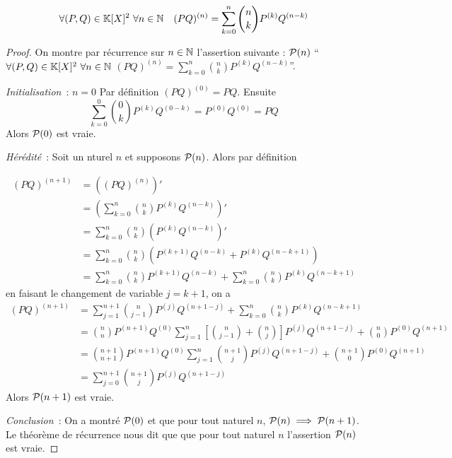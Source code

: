 \begin{theo}
  \begin{equation}
    \forall (P,Q) \in \K[X]^2 \ \forall n \in \N \quad (PQ)^{(n)} = \sum_{k = 0}^n 
    \binom{n}{k} P^{(k)}Q^{(n-k)}
  \end{equation}
\end{theo}
\begin{proof}
  On montre par récurrence sur \(n \in \N\) l'assertion suivante : \(\P(n)\) 
  ``\(\forall (P,Q) \in \K[X]^2 \ \forall n \in \N\) \((PQ)^{(n)} = \sum_{k = 0}^n 
  \binom{n}{k} P^{(k)}Q^{(n-k)}\)''.

  \emph{Initialisation}~: \(n = 0\) Par définition \((PQ)^{(0)} = PQ\). Ensuite
  \begin{equation}
    \sum_{k = 0}^0 \binom{0}{k} P^{(k)}Q^{(0-k)} = P^{(0)} Q^{(0)} = PQ
  \end{equation}
  Alors \(\P(0)\) est  vraie.

  \emph{Hérédité}~: Soit un nturel \(n\) et supposons \(\P(n)\). Alors par 
  définition

  \begin{align}
    (PQ)^{(n+1)} &= \left((PQ)^{(n)}\right)' \\
    & = \left(\sum_{k = 0}^n \binom{n}{k} P^{(k)}Q^{(n-k)}\right)'\\
    & = \sum_{k = 0}^n \binom{n}{k} (P^{(k)}Q^{(n-k)})'\\
    & = \sum_{k = 0}^n \binom{n}{k} (P^{(k+1)}Q^{(n-k)} + P^{(k)} Q^{(n-k+1)})\\
    & = \sum_{k = 0}^n \binom{n}{k} P^{(k+1)}Q^{(n-k)} + \sum_{k = 0}^n \binom{n}{k} 
    P^{(k)} Q^{(n-k+1)}
  \end{align}
  en faisant le changement de variable \(j = k+1\), on a
  \begin{align}
    (PQ)^{(n+1)} & = \sum_{j = 1}^{n+1} \binom{n}{j-1} P^{(j)}Q^{(n+1-j)} + 
    \sum_{k = 0}^n \binom{n}{k} P^{(k)} Q^{(n-k+1)}\\
    & = \binom{n}{n} P^{(n+1)}Q^{(0)} \sum_{j = 1}^{n} \left[\binom{n}{j-1} + 
    \binom{n}{j} \right] P^{(j)}Q^{(n+1-j)} + \binom{n}{0} P^{(0)}Q^{(n+1)} \\
    & = \binom{n+1}{n+1} P^{(n+1)}Q^{(0)} \sum_{j = 1}^{n} \binom{n+1}{j} 
    P^{(j)}Q^{(n+1-j)} + \binom{n+1}{0} P^{(0)}Q^{(n+1)} \\
    & = \sum_{j = 0}^{n+1} \binom{n+1}{j} P^{(j)}Q^{(n+1-j)}
  \end{align}
  Alors \(\P(n+1)\) est vraie.

  \emph{Conclusion}~: On a montré \(\P(0)\) et que pour tout naturel \(n\), 
  \(\P(n) \implies \P(n+1)\). Le théorème de récurrence nous dit que que pour 
  tout naturel \(n\) l'assertion \(\P(n)\) est vraie.
\end{proof}

